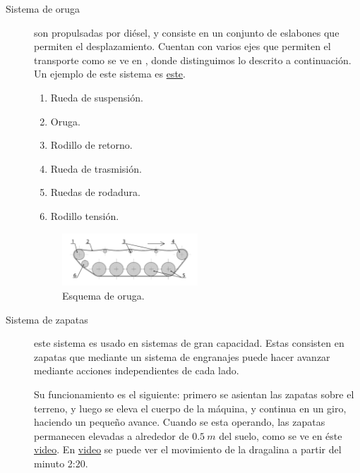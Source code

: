 \documentclass[a4paper]{article}
\begin{document}
\begin{description}
  \item[Sistema de oruga] son propulsadas por diésel, y consiste en un conjunto
    de eslabones que permiten el desplazamiento. Cuentan con varios ejes que 
    permiten el transporte como se ve en , donde distinguimos lo 
    descrito a continuación. Un ejemplo de este sistema es 
    \href{https://www.youtube.com/watch?v=V4TK7boaxXM&t=8s}{este}.

    \begin{enumerate}
      \item Rueda de suspensión.
      \item Oruga.
      \item Rodillo de retorno.
      \item Rueda de trasmisión.
      \item Ruedas de rodadura.
      \item Rodillo tensión.
    \end{enumerate}

    \begin{figure}[ht]
      \centering
      \includegraphics[width=0.5\textwidth]{../images/apuntes-presentacion-20210429/oruga}
      \caption{Esquema de oruga.}
      \label{fig:oruga}
    \end{figure}
  \item[Sistema de zapatas] este sistema es usado en sistemas de gran capacidad.
    Estas consisten en zapatas que mediante un sistema de engranajes puede hacer
    avanzar mediante acciones independientes de cada lado. 

    Su funcionamiento es el siguiente: primero se asientan las zapatas sobre el
    terreno, y luego se eleva el cuerpo de la máquina, y continua en un giro, haciendo
    un pequeño avance. Cuando se esta operando, las zapatas permanecen elevadas
    a alrededor de $\SI{0.5}{m}$ del suelo, como se ve en 
    éste \href{https://www.youtube.com/watch?v=-B_bRWVuITA}{video}.
    En \href{https://www.youtube.com/watch?v=iXDAXXRLupQ}{video} se puede ver el
    movimiento de la dragalina a partir del minuto 2:20.

\end{description}
\end{document}
